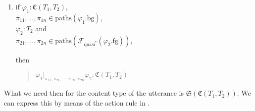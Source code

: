 \begin{shaded}
\begin{enumerate}
\item \begin{tabbing}
    if \=$\varphi_1:\mathfrak{C}(T_1,T_2)$,\\
  \>$\pi_{11},\ldots,\pi_{1n}\in\mathrm{paths}(\varphi_1.\text{bg})$,\\ \>$\varphi_2:T_2$ and\\
\>$\pi_{21},\ldots,\pi_{2n}\in\mathrm{paths}(\mathcal{F}_{\text{quasi}^*}(\varphi_2.\text{fg}))$,
  \end{tabbing}
  then
  \begin{quote}
    $\varphi_1|_{\pi_{11},\pi_{21};\ldots;\pi_{1n},\pi_{2n}}\varphi_2:\mathfrak{C}(T_1,T_2)$
  \end{quote}
  
 
\end{enumerate} 
What we need then for the content type of the utterance is
$\mathfrak{S}(\mathfrak{C}(T_1,T_2))$.  We can express this by means
of the action rule in \nexteg{}.
\end{shaded}
\begin{sidewaysfigure}
\begin{ex}
  
  \begin{prooftree}
  \end{prooftree}
  
\end{ex} 
\end{sidewaysfigure}  
  



  




 
